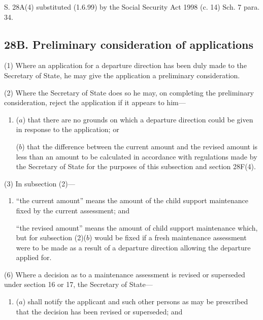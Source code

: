 \documentclass[a4paper]{article}
\begin{document}
{{S. 28A(4) substituted (1.6.99) by the Social Security Act 1998 (c. 14) Sch. 7 para. 34.


}

\subsection{28B. Preliminary consideration of applications}

(1) Where an application for a departure direction has been duly made to the Secretary of State, he may give the application a preliminary consideration.

(2) Where the Secretary of State does so he may, on completing the preliminary consideration, reject the application if it appears to him---
\begin{enumerate}\item[]
($a$) that there are no grounds on which a departure direction could be given in response to the application; or

($b$) that the difference between the current amount and the revised amount is less than an amount to be calculated in accordance with regulations made by the Secretary of State for the purposes of this subsection and section 28F(4).
\end{enumerate}

(3) In subsection (2)---
\begin{enumerate}\item[]
 “the current amount” means the amount of the child support maintenance fixed by the current assessment; and 

“the revised amount” means the amount of child support maintenance which, but for subsection (2)($b$) would be fixed if a fresh maintenance assessment were to be made as a result of a departure direction allowing the departure applied for.
\end{enumerate}

(6) Where a decision as to a maintenance assessment is revised or superseded under section 16 or 17, the Secretary of State---
\begin{enumerate}\item[]
($a$) shall notify the applicant and such other persons as may be prescribed that the decision has been revised or superseded; and


\end{enumerate}}
\end{document}
